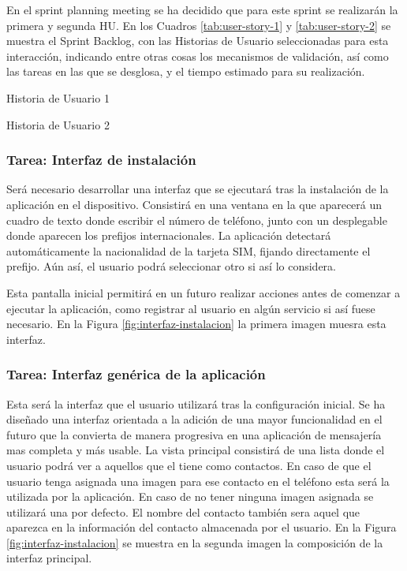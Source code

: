 En el sprint planning meeting se ha decidido que para este sprint se realizarán la primera y segunda \ac{HU}. En los Cuadros \ref{tab:user-story-1} y \ref{tab:user-story-2} se muestra el Sprint Backlog, con las Historias de Usuario seleccionadas para esta interacción, indicando entre otras cosas los mecanismos de validación, así como las tareas en las que se desglosa, y el tiempo estimado para su realización.

\begin{table}[hp]
  \centering
  {\small
  
  }
  \caption{Historia de Usuario 1}
  \label{tab:user-story-1}
\end{table}

\begin{table}[hp]
  \centering
  {\small
  
  }
  \caption{Historia de Usuario 2}
  \label{tab:user-story-2}
\end{table}

\subsubsection{Tarea: Interfaz de instalación}

Será necesario desarrollar una interfaz que se ejecutará tras la instalación de la aplicación en el dispositivo. Consistirá en una ventana en la que aparecerá un cuadro de texto donde escribir el número de teléfono, junto con un desplegable donde aparecen los prefijos internacionales. La aplicación detectará automáticamente la nacionalidad de la tarjeta SIM, fijando directamente el prefijo. Aún así, el usuario podrá seleccionar otro si así lo considera.

Esta pantalla inicial permitirá en un futuro realizar acciones antes de comenzar a ejecutar la aplicación, como registrar al usuario en algún servicio si así fuese necesario. En la Figura \ref{fig:interfaz-instalacion} la primera imagen muesra esta interfaz.


\subsubsection{Tarea: Interfaz genérica de la aplicación}

Esta será la interfaz que el usuario utilizará tras la configuración inicial. Se ha diseñado una interfaz orientada a la adición de una mayor funcionalidad en el futuro que la convierta de manera progresiva en una aplicación de mensajería mas completa y más usable. La vista principal consistirá de una lista donde el usuario podrá ver a aquellos que el tiene como contactos. En caso de que el usuario tenga asignada una imagen para ese contacto en el teléfono esta será la utilizada por la aplicación. En caso de no tener ninguna imagen asignada se utilizará una por defecto. El nombre del contacto también sera aquel que aparezca en la información del contacto almacenada por el usuario. En la Figura \ref{fig:interfaz-instalacion} se muestra en la segunda imagen la composición de la interfaz principal.

